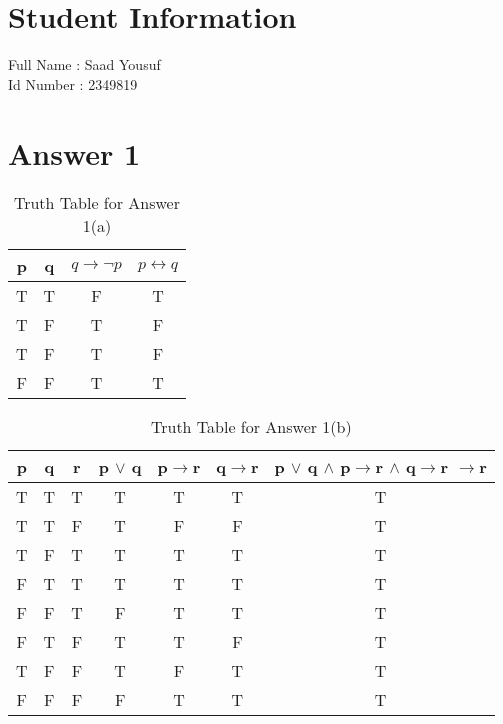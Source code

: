\documentclass[12pt]{article}
\begin{document}
\section*{Student Information } 
Full Name : Saad Yousuf \\
Id Number : 2349819 \\

\section*{Answer 1}


\begin{table}[h]
\small
\centering
\caption{Truth Table for Answer 1(a)}
\label{table:example}
\begin{tabular}{|c|c|c|c|}	%
\hline 							%
\textbf{p} & \textbf{q} & \textbf{$q \rightarrow  \neg p$} & \textbf{$p \leftrightarrow q$} \\%
\hline 
\hline 
T & T & F & T \\			%
T & F & T & F \\
T & F & T & F \\
F & F & T & T \\
\hline 

\end{tabular}
\end{table}



\begin{table}[h]
\small
\centering
\caption{Truth Table for Answer 1(b)}
\label{table:example}
\begin{tabular}{|c|c|c|c|c|c|c}	%
\hline 							%
\textbf{p} & \textbf{q} & \textbf{r} & \textbf{p $\vee$ q} & \textbf{p$\rightarrow$r} & \textbf{q$\rightarrow$r} & \textbf{p $\vee$ q $\wedge$ p$\rightarrow$r $\wedge$ q$\rightarrow$r $\rightarrow$r} \\%
\hline 
\hline 
T & T & T & T & T & T & T \\			%
T & T & F & T & F & F & T \\
T & F & T & T & T & T & T \\
F & T & T & T & T & T & T \\
F & F & T & F & T & T & T \\
F & T & F & T & T & F & T \\
T & F & F & T & F & T & T \\
F & F & F & F & T & T & T \\
\hline 

\end{tabular}
\end{table}
\end{document}

